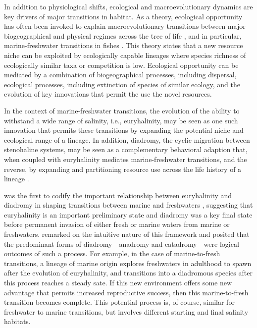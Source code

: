 \documentclass[11pt]{article}
\begin{document}
In addition to physiological shifts, ecological and macroevolutionary dynamics are key drivers of major transitions in habitat. As a theory, ecological opportunity has often been invoked to explain macroevolutionary transitions between major biogeographical and physical regimes across the tree of life \citep{yoder2010ecological,stroud2016ecological,simpson1984tempo,simpson1953major}, and in particular, marine-freshwater transitions in fishes \citep{davis2012marine,betancur2012apparent, santini2013habitat}. This theory states that a new resource niche can be exploited by ecologically capable lineages where species richness of ecologically similar taxa or competition is low. Ecological opportunity can be mediated by a combination of biogeographical processes, including dispersal, ecological processes, including extinction of species of similar ecology, and the evolution of key innovations that permit the use the novel resources. 

In the context of marine-freshwater transitions, the evolution of the ability to withstand a wide range of salinity, i.e., euryhalinity, may be seen as one such innovation that permits these transitions by expanding the potential niche and ecological range of a lineage. In addition, diadromy, the cyclic migration between stenohaline systems, may be seen as a complementary behavioral adaption that, when coupled with euryhalinity mediates marine-freshwater transitions, and the reverse, by expanding and partitioning resource use across the life history of a lineage \citep{mcdowall1997evolution,mcdowall2001diadromy}.

\cite{gross1987evolution} was the first to codify the important relationship between euryhalinity and diadromy in shaping transitions between marine and freshwaters \citep{mcdowall1997evolution}, suggesting that euryhalinity is an important preliminary state and diadromy was a key final state before permanent invasion of either fresh or marine waters from marine or freshwaters. \cite{mcdowall1997evolution} remarked on the intuitive nature of this framework and posited that the predominant forms of diadromy---anadromy and catadromy---were logical outcomes of such a process. For example, in the case of marine-to-fresh transitions, a lineage of marine origin explores freshwaters in adulthood to spawn after the evolution of euryhalinity, and transitions into a diadromous species after this process reaches a steady sate. If this new environment offers some new advantage that permits increased reproductive success, then this marine-to-fresh transition becomes complete. This potential process is, of course, similar for freshwater to marine transitions, but involves different starting and final salinity habitats. 
\end{document}
